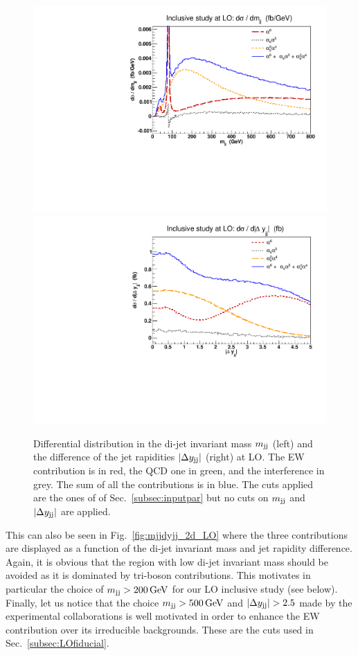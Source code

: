 \begin{figure}[hbt]
\centering
\includegraphics[scale=0.395]{figures/scanfigures/mjj_full.pdf}
\includegraphics[scale=0.395]{figures/scanfigures/dyjj_full.pdf}
\caption{Differential distribution in the di-jet invariant mass $m_{\text{j}\text{j}}$ (left) and the difference of the jet rapidities $|\Delta y_{\text{j}\text{j}}|$ (right) at LO.
The EW contribution is in red, the QCD one in green, and the interference in grey.
The sum of all the contributions is in blue.
The cuts applied are the ones of of Sec.~\ref{subsec:inputpar} but no cuts on $m_{\text{j}\text{j}}$ and $|\Delta y_{\text{j}\text{j}}|$ are applied.}
\label{fig:mjjdyjj_1d}
\end{figure}

This can also be seen in Fig.~\ref{fig:mjjdyjj_2d_LO} where the three contributions are displayed as a function of the di-jet invariant mass and jet rapidity difference.
Again, it is obvious that the region with low di-jet invariant mass should be avoided as it is dominated by tri-boson contributions.
This motivates in particular the choice of $m_{\text{j}\text{j}} > 200\,\text{GeV}$ for our LO inclusive study (see below).
Finally, let us notice that the choice $m_{\text{j}\text{j}} > 500\,\text{GeV}$ and $|\Delta y_{\text{j}\text{j}}| > 2.5$ made by the experimental collaborations is well motivated in order to enhance the EW contribution over its irreducible backgrounds.
These are the cuts used in Sec.~\ref{subsec:LOfiducial}.

